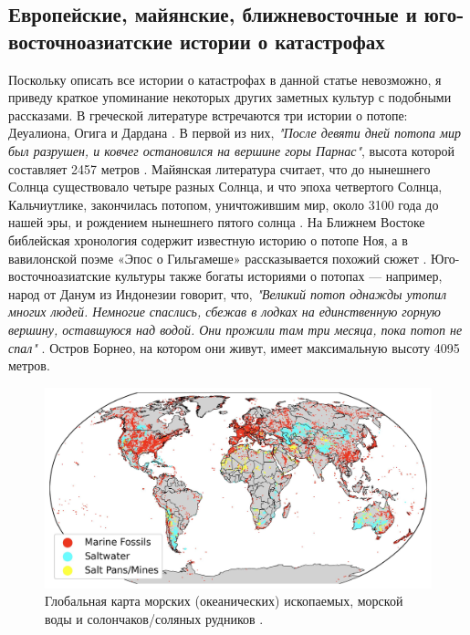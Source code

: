 \documentclass[10pt,twocolumn,letterpaper]{article}
\begin{document}
\subsection{Европейские, майянские, ближневосточные и юго-восточноазиатские истории о катастрофах}

Поскольку описать все истории о катастрофах в данной статье невозможно, я приведу краткое упоминание некоторых других заметных культур с подобными рассказами. В греческой литературе встречаются три истории о потопе: Деуалиона, Огига и Дардана \cite{9,10}. В первой из них, \textit{"После девяти дней потопа мир был разрушен, и ковчег остановился на вершине горы Парнас"}, высота которой составляет 2457 метров \cite{11}. Майянская литература считает, что до нынешнего Солнца существовало четыре разных Солнца, и что эпоха четвертого Солнца, Кальчиутлике, закончилась потопом, уничтожившим мир, около 3100 года до нашей эры, и рождением нынешнего пятого солнца \cite{12}. На Ближнем Востоке библейская хронология содержит известную историю о потопе Ноя, а в вавилонской поэме «Эпос о Гильгамеше» рассказывается похожий сюжет \cite{13}. Юго-восточноазиатские культуры также богаты историями о потопах — например, народ от Данум из Индонезии говорит, что, \textit{"Великий потоп однажды утопил многих людей. Немногие спаслись, сбежав в лодках на единственную горную вершину, оставшуюся над водой. Они прожили там три месяца, пока потоп не спал"} \cite{3}. Остров Борнео, на котором они живут, имеет максимальную высоту 4095 метров.

\begin{figure}[b]
\begin{center}
\includegraphics[width=1\textwidth]{marine.jpg}
\end{center}
   \caption{Глобальная карта морских (океанических) ископаемых, морской воды и солончаков/соляных рудников \cite{15,16,86,87}.}
\label{fig:2}
\end{figure}
\end{document}
